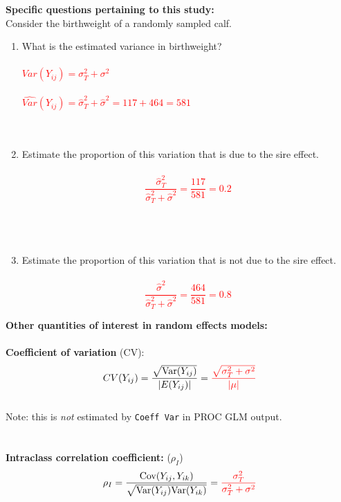 \textbf{Specific questions pertaining to this study:}\\
Consider the birthweight of a randomly sampled calf.
\begin{enumerate}
\item What is the estimated variance in birthweight?\\~\\%
\textcolor{red}{$Var(Y_{ij})=\sigma^2_T+\sigma^2$\\~\\
$\hat{Var}(Y_{ij})=\hat{\sigma}^2_T+\hat{\sigma}^2=117+464=581$}\\~\\~\\
\item Estimate the proportion of this variation that is due to the sire effect.\\~\\%
\textcolor{red}{$$\frac{\hat{\sigma}^2_T}{\hat{\sigma}^2_T+\hat{\sigma}^2}=\frac{117}{581}=0.2$$}\\~\\~\\
\item Estimate the proportion of this variation that is not due to the sire effect.
\\~\\
\textcolor{red}{$$\frac{\hat{\sigma}^2}{\hat{\sigma}^2_T+\hat{\sigma}^2}=\frac{464}{581}=0.8$$}

\end{enumerate}

\newpage

\textbf{Other quantities of interest in random effects models:}\\~\\
\textbf{Coefficient of variation} (CV): 
$$ CV(Y_{ij}) = \frac{\sqrt{\mbox{Var}(Y_{ij})}}{|E(Y_{ij})|} = \textcolor{red}{\frac{\sqrt{\sigma_T^2 + \sigma^2}}{|\mu|}}$$~\\
Note: this is {\em not} estimated by {\tt Coeff Var} in PROC GLM output.\\~\\~\\

\textbf{Intraclass correlation coefficient:} ($\rho_I$)
$$ \rho_I = \frac{\mbox{Cov}(Y_{ij},Y_{ik})}{\sqrt{\mbox{Var}(Y_{ij})\mbox{Var}(Y_{ik})}}= \textcolor{red}{\frac{\sigma_T^2}{\sigma_T^2 + \sigma^2}}$$

